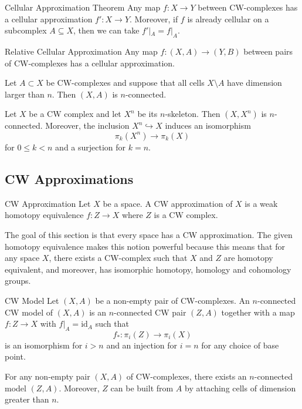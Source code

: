 \documentclass[a4paper]{article}
\begin{document}
\begin{thm}{Cellular Approximation Theorem}{} Any map $f:X\to Y$ between CW-complexes has a cellular approximation $f':X\to Y$. Moreover, if $f$ is already cellular on a subcomplex $A\subseteq X$, then we can take $f'|_A=f|_A$. 
\end{thm}

\begin{thm}{Relative Cellular Approximation}{} Any map $f:(X,A)\to (Y,B)$ between pairs of CW-complexes has a cellular approximation. 
\end{thm}

\begin{crl}{}{} Let $A\subset X$ be CW-complexes and suppose that all cells $X\setminus A$ have dimension larger than $n$. Then $(X,A)$ is $n$-connected. 
\end{crl}

\begin{crl}{}{} Let $X$ be a CW complex and let $X^n$ be its $n$-skeleton. Then $(X,X^n)$ is $n$-connected. Moreover, the inclusion $X^n\hookrightarrow X$ induces an isomorphism $$\pi_k(X^n)\to\pi_k(X)$$ for $0\leq k<n$ and a surjection for $k=n$. 
\end{crl}

\subsection{CW Approximations}
\begin{defn}{CW Approximation}{} Let $X$ be a space. A CW approximation of $X$ is a weak homotopy equivalence $f:Z\to X$ where $Z$ is a CW complex. 
\end{defn}

The goal of this section is that every space has a CW approximation. The given homotopy equivalence makes this notion powerful because this means that for any space $X$, there exists a CW-complex such that $X$ and $Z$ are homotopy equivalent, and moreover, has isomorphic homotopy, homology and cohomology groups. 

\begin{defn}{CW Model}{} Let $(X,A)$ be a non-empty pair of CW-complexes. An $n$-connected CW model of $(X,A)$ is an $n$-connected CW pair $(Z,A)$ together with a map $f:Z\to X$ with $f|_A=\text{id}_A$ such that $$f_\ast:\pi_i(Z)\to\pi_i(X)$$ is an isomorphism for $i>n$ and an injection for $i=n$ for any choice of base point. 
\end{defn}

\begin{thm}{}{} For any non-empty pair $(X,A)$ of CW-complexes, there exists an $n$-connected model $(Z,A)$. Moreover, $Z$ can be built from $A$ by attaching cells of dimension greater than $n$. 
\end{thm}
\end{document}
